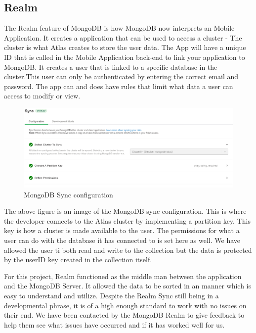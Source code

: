 \subsection{Realm}
The Realm feature of MongoDB is how MongoDB now interprets an Mobile Application. It creates a application that can be used to access a cluster - The cluster is what Atlas creates to store the user data.
\newline
The App will have a unique ID that is called in the Mobile Application back-end to link your application to MongoDB. It creates a user that is linked to a specific database in the cluster.This user can only be authenticated by entering the correct email and password. The app can and does have rules that limit what data a user can access to modify or view.
\newline
\begin{figure}[H]
    \centering
    \includegraphics[width=15cm]{img/syncSetup.PNG}
    \caption{MongoDB Sync configuration}
    \label{fig:altas config}
\end{figure}
The above figure is an image of the MongoDB sync configuration. This is where the developer connects to the Atlas cluster by implementing a partition key. This key is how a cluster is made available to the user. The permissions for what a user can do with the database it has connected to is set here as well. We have allowed the user ti both read and write to the collection but the data is protected by the userID key created in the collection itself.

For this project, Realm functioned as the middle man between the application and the MongoDB Server. It allowed the data to be sorted in an manner which is easy to understand and utilize. Despite the Realm Sync still being in a developmental phrase, it is of a high enough standard to work with no issues on their end. We have been contacted by the MongoDB Realm to give feedback to help them see what issues have occurred and if it has worked well for us.

